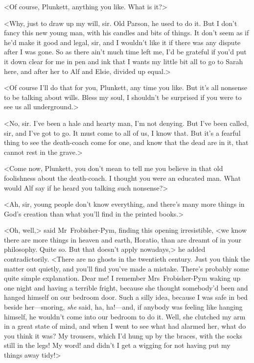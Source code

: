 <Of course, Plunkett, anything you like. What is it?>

<Why, just to draw up my will, sir. Old Parson, he used to do it. But I don't fancy this new young man, with his candles and bits of things. It don't seem as if he'd make it good and legal, sir, and I wouldn't like it if there was any dispute after I was gone. So as there ain't much time left me, I'd be grateful if you'd put it down clear for me in pen and ink that I wants my little bit all to go to Sarah here, and after her to Alf and Elsie, divided up equal.>

<Of course I'll do that for you, Plunkett, any time you like. But it's all nonsense to be talking about wills. Bless my soul, I shouldn't be surprised if you were to see us all underground.>

<No, sir. I've been a hale and hearty man, I'm not denying. But I've been called, sir, and I've got to go. It must come to all of us, I know that. But it's a fearful thing to see the death-coach come for one, and know that the dead are in it, that cannot rest in the grave.>

<Come now, Plunkett, you don't mean to tell me you believe in that old foolishness about the death-coach. I thought you were an educated man. What would Alf say if he heard you talking such nonsense?>

<Ah, sir, young people don't know everything, and there's many more things in God's creation than what you'll find in the printed books.>

<Oh, well,> said Mr~Frobisher-Pym, finding this opening irresistible, <we know there are more things in heaven and earth, Horatio, than are dreamt of in your philosophy. Quite so. But that doesn't apply nowadays,> he added contradictorily. <There are no ghosts in the twentieth century. Just you think the matter out quietly, and you'll find you've made a mistake. There's probably some quite simple explanation. Dear me! I remember Mrs~Frobisher-Pym waking up one night and having a terrible fright, because she thought somebody'd been and hanged himself on our bedroom door. Such a silly idea, because I was safe in bed beside her—snoring, \textit{she} said, ha, ha!—and, if anybody was feeling like hanging himself, he wouldn't come into our bedroom to do it. Well, she clutched my arm in a great state of mind, and when I went to see what had alarmed her, what do you think it was? My trousers, which I'd hung up by the braces, with the socks still in the legs! My word! and didn't I get a wigging for not having put my things away tidy!>

